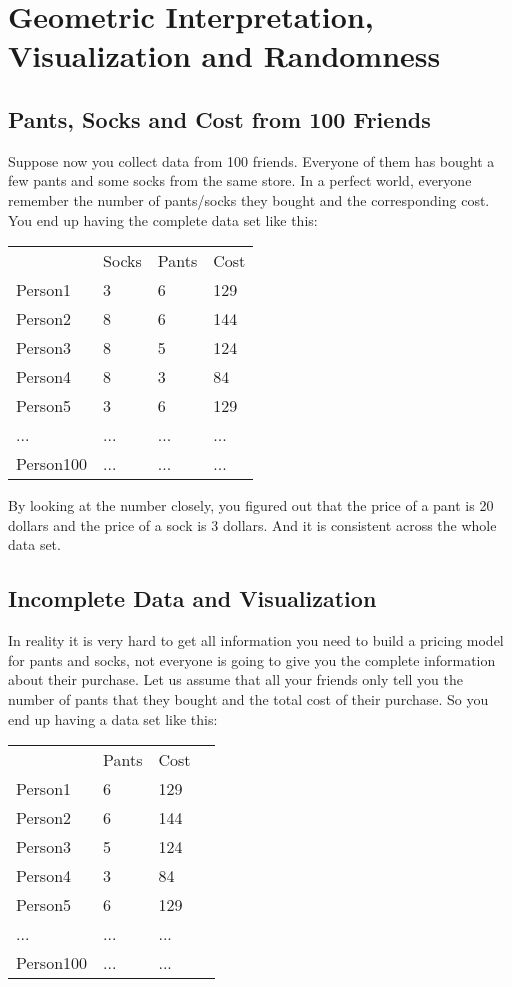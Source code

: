 \documentclass[12pt, oneside]{article}
\begin{document}
\section{Geometric Interpretation, Visualization and Randomness}
\subsection{Pants, Socks and Cost from 100 Friends}

Suppose now you collect data from 100 friends. Everyone of them has bought a few pants and some socks from the same store. In a perfect world, everyone remember the number of pants/socks they bought and the corresponding cost. You end up having the complete data set like this:

\vspace{.1in}
\begin{tabular}{llll}
 &Socks  &Pants &Cost  \\
Person1 &3	&6	&129\\
Person2 &8	&6	&144\\
Person3 &8	&5	&124\\
Person4 &8	&3	&84\\
Person5 &3	&6	&129\\
... & ... &... &...\\
Person100 & ...&...&...
\end{tabular}
\vspace{.1in}

By looking at the number closely, you figured out that the price of a pant is 20 dollars and the price of a sock is 3 dollars. And it is consistent across the whole data set.

\subsection{Incomplete Data and Visualization }
In reality it is very hard to get all information you need to build a pricing model for pants and socks, not everyone is going to give you the complete information about their purchase. Let us assume that all your friends only tell you the number of pants that they bought and the total cost of their purchase. So you end up having a data set like this:

\vspace{.1in}
\begin{tabular}{llll}
 &Pants   &Cost  \\
Person1 &6	&129\\
Person2 &6	&144\\
Person3 &5	&124\\
Person4 &3	&84\\
Person5 &6	&129\\
... & ... &...\\
Person100 &...&...
\end{tabular}
\vspace{.1in}
\end{document}
